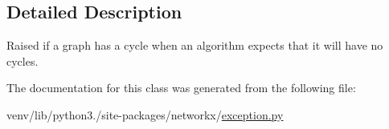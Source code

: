 \subsection{Detailed Description}
\begin{DoxyVerb}Raised if a graph has a cycle when an algorithm expects that it
will have no cycles.\end{DoxyVerb}
 

The documentation for this class was generated from the following file\+:\begin{DoxyCompactItemize}
\item 
venv/lib/python3./site-\/packages/networkx/\hyperlink{exception_8py}{exception.\+py}\end{DoxyCompactItemize}
